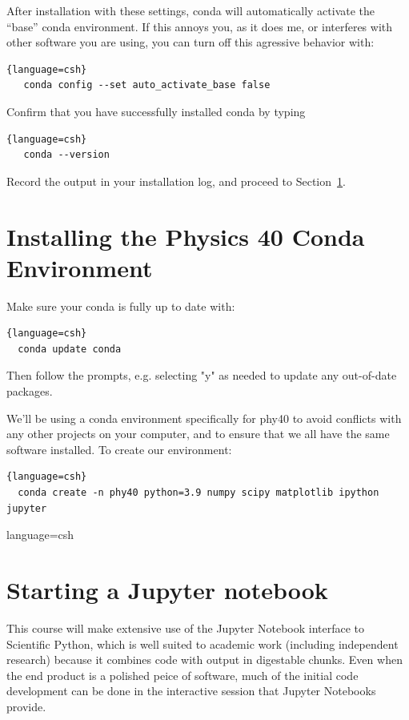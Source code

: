 After installation with these settings, conda will automatically
activate the ``base'' conda environment.  If this annoys you, as it
does me, or interferes with other software you are using, you can turn
off this agressive behavior with:
\begin{lstlisting}{language=csh}
   conda config --set auto_activate_base false
\end{lstlisting}

Confirm that you have successfully installed conda by typing
\begin{lstlisting}{language=csh}
   conda --version
\end{lstlisting}
Record the output in your installation log, and proceed to Section~\ref{sec:env}.

\section{Installing the Physics 40 Conda Environment}
\label{sec:env}

Make sure your conda is fully up to date with:
\begin{lstlisting}{language=csh}
  conda update conda
\end{lstlisting}
Then follow the prompts, e.g. selecting "y" as needed to update any out-of-date packages.

We'll be using a conda environment specifically for phy40 to avoid
conflicts with any other projects on your computer, and to ensure that
we all have the same software installed.  To create our environment:
\begin{lstlisting}{language=csh}
  conda create -n phy40 python=3.9 numpy scipy matplotlib ipython jupyter
\end{lstlisting}{language=csh}
  
\section{Starting a Jupyter notebook}

This course will make extensive use of the Jupyter Notebook interface
to Scientific Python, which is well suited to academic work (including
independent research) because it combines code with output in
digestable chunks.  Even when the end product is a polished peice of
software, much of the initial code development can be done in the interactive
session that Jupyter Notebooks provide.  

